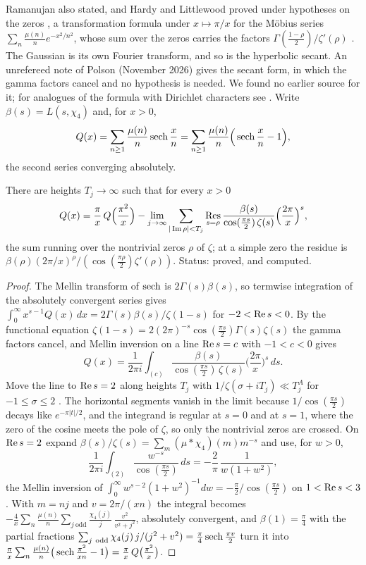 Ramanujan also stated, and Hardy and Littlewood proved under hypotheses on the zeros \cite{HL16}, a transformation formula under $x\mapsto\pi/x$ for the M\"obius series $\sum_n\frac{\mu(n)}ne^{-x^2/n^2}$, whose sum over the zeros carries the factors $\Gamma(\frac{1-\rho}2)/\zeta'(\rho)$ \cite[Section 9.8]{Titchmarsh}. The Gaussian is its own Fourier transform, and so is the hyperbolic secant. An unrefereed note of Polson (November 2026) gives the secant form, in which the gamma factors cancel and no hypothesis is needed. We found no earlier source for it; for analogues of the formula with Dirichlet characters see \cite{DRZ16}. Write $\beta(s)=L(s,\chi_4)$ and, for $x>0$,
\[
Q(x)=\sum_{n\ge1}\frac{\mu(n)}n\operatorname{sech}\frac xn=\sum_{n\ge1}\frac{\mu(n)}n\Big(\operatorname{sech}\frac xn-1\Big),
\]
the second series converging absolutely.

\begin{proposition}\label{dl:prop:sechram}
There are heights $T_j\to\infty$ such that for every $x>0$
\[
Q(x)=\frac\pi x\,Q\Big(\frac{\pi^2}x\Big)-\lim_{j\to\infty}\sum_{|\operatorname{Im}\rho|<T_j}\operatorname*{Res}_{s=\rho}\frac{\beta(s)}{\cos(\frac{\pi s}2)\,\zeta(s)}\Big(\frac{2\pi}x\Big)^s,
\]
the sum running over the nontrivial zeros $\rho$ of $\zeta$; at a simple zero the residue is $\beta(\rho)(2\pi/x)^\rho/(\cos(\frac{\pi\rho}2)\zeta'(\rho))$. Status: proved, and computed.
\end{proposition}

\begin{proof}
The Mellin transform of $\operatorname{sech}$ is $2\Gamma(s)\beta(s)$, so termwise integration of the absolutely convergent series gives $\int_0^\infty x^{s-1}Q(x)\,dx=2\Gamma(s)\beta(s)/\zeta(1-s)$ for $-2<\operatorname{Re} s<0$. By the functional equation $\zeta(1-s)=2(2\pi)^{-s}\cos(\frac{\pi s}2)\Gamma(s)\zeta(s)$ the gamma factors cancel, and Mellin inversion on a line $\operatorname{Re} s=c$ with $-1<c<0$ gives
\[
Q(x)=\frac1{2\pi i}\int_{(c)}\frac{\beta(s)}{\cos(\frac{\pi s}2)\,\zeta(s)}\Big(\frac{2\pi}x\Big)^s\,ds .
\]
Move the line to $\operatorname{Re} s=2$ along heights $T_j$ with $1/\zeta(\sigma+iT_j)\ll T_j^A$ for $-1\le\sigma\le2$ \cite[Theorem 9.7]{Titchmarsh}. The horizontal segments vanish in the limit because $1/\cos(\frac{\pi s}2)$ decays like $e^{-\pi|t|/2}$, and the integrand is regular at $s=0$ and at $s=1$, where the zero of the cosine meets the pole of $\zeta$, so only the nontrivial zeros are crossed. On $\operatorname{Re} s=2$ expand $\beta(s)/\zeta(s)=\sum_m(\mu*\chi_4)(m)m^{-s}$ and use, for $w>0$,
\[
\frac1{2\pi i}\int_{(2)}\frac{w^{-s}}{\cos(\frac{\pi s}2)}\,ds=-\frac2\pi\,\frac1{w(1+w^2)},
\]
the Mellin inversion of $\int_0^\infty w^{s-2}(1+w^2)^{-1}dw=-\frac\pi2/\cos(\frac{\pi s}2)$ on $1<\operatorname{Re} s<3$. With $m=nj$ and $v=2\pi/(xn)$ the integral becomes $-\frac4x\sum_n\frac{\mu(n)}n\sum_{j\ \mathrm{odd}}\frac{\chi_4(j)}j\,\frac{v^2}{v^2+j^2}$, absolutely convergent, and $\beta(1)=\frac\pi4$ with the partial fractions $\sum_{j\ \mathrm{odd}}\chi_4(j)\,j/(j^2+v^2)=\frac\pi4\sech\frac{\pi v}2$ turn it into $\frac\pi x\sum_n\frac{\mu(n)}n\big(\operatorname{sech}\frac{\pi^2}{xn}-1\big)=\frac\pi x\,Q\big(\frac{\pi^2}x\big)$.
\end{proof}


